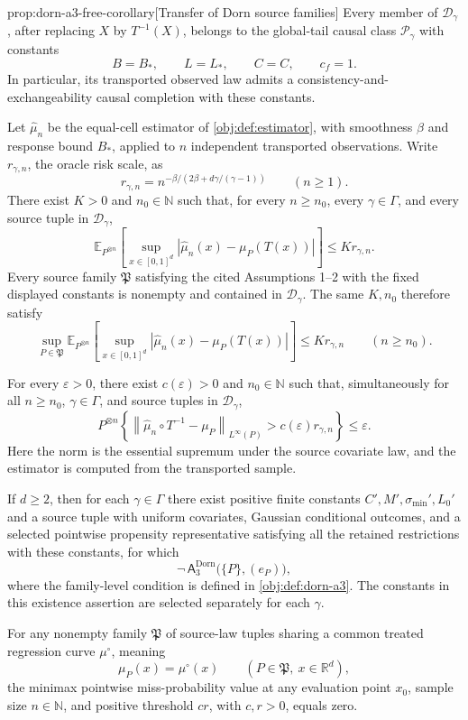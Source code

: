 \documentclass[11pt]{article}
\begin{document}
\begin{propositionv}{prop:dorn-a3-free-corollary}[Transfer of Dorn source families]
Every member of \(\mathcal D_\gamma\), after replacing \(X\) by \(T^{-1}(X)\), belongs to the global-tail causal class \(\mathcal P_\gamma\) with constants
\[
B=B_*,
\qquad L=L_*,
\qquad C=C,
\qquad c_f=1.
\]
In particular, its transported observed law admits a consistency-and-exchangeability causal completion with these constants.

Let \(\widehat\mu_n\) be the equal-cell estimator of \cref{obj:def:estimator}, with smoothness \(\beta\) and response bound \(B_*\), applied to \(n\) independent transported observations. Write \(r_{\gamma,n}\), the oracle risk scale, as
\[
r_{\gamma,n}=n^{-\beta/(2\beta+d\gamma/(\gamma-1))}
\qquad(n\ge1).
\]
There exist \(K>0\) and \(n_0\in\mathbb N\) such that, for every \(n\ge n_0\), every \(\gamma\in\Gamma\), and every source tuple in \(\mathcal D_\gamma\),
\[
\mathbb E_{P^{\otimes n}}
\left[
\sup_{x\in[0,1]^d}
\left|\widehat\mu_n(x)-\mu_P(T(x))\right|
\right]
\le K r_{\gamma,n}.
\]
Every source family \(\mathfrak P\) satisfying the cited Assumptions 1--2 with the fixed displayed constants is nonempty and contained in \(\mathcal D_\gamma\). The same \(K,n_0\) therefore satisfy
\[
\sup_{P\in\mathfrak P}
\mathbb E_{P^{\otimes n}}
\left[
\sup_{x\in[0,1]^d}
\left|\widehat\mu_n(x)-\mu_P(T(x))\right|
\right]
\le K r_{\gamma,n}
\qquad(n\ge n_0).
\]

For every \(\varepsilon>0\), there exist \(c(\varepsilon)>0\) and \(n_0\in\mathbb N\) such that, simultaneously for all \(n\ge n_0\), \(\gamma\in\Gamma\), and source tuples in \(\mathcal D_\gamma\),
\[
P^{\otimes n}\!\left\{
\left\|\widehat\mu_n\circ T^{-1}-\mu_P\right\|_{L^\infty(P)}
>c(\varepsilon)r_{\gamma,n}
\right\}\le\varepsilon.
\]
Here the norm is the essential supremum under the source covariate law, and the estimator is computed from the transported sample.

If \(d\ge2\), then for each \(\gamma\in\Gamma\) there exist positive finite constants \(C',M',\sigma_{\min}',L_0'\) and a source tuple with uniform covariates, Gaussian conditional outcomes, and a selected pointwise propensity representative satisfying all the retained restrictions with these constants, for which
\[
\neg\,
\mathsf A_{3}^{\mathrm{Dorn}}
\bigl(\{P\},(e_P)\bigr),
\]
where the family-level condition is defined in \cref{obj:def:dorn-a3}. The constants in this existence assertion are selected separately for each \(\gamma\).

For any nonempty family \(\mathfrak P\) of source-law tuples sharing a common treated regression curve \(\mu^\circ\), meaning
\[
\mu_P(x)=\mu^\circ(x)
\qquad(P\in\mathfrak P,\ x\in\mathbb R^d),
\]
the minimax pointwise miss-probability value at any evaluation point \(x_0\), sample size \(n\in\mathbb N\), and positive threshold \(cr\), with \(c,r>0\), equals zero.


\end{propositionv}
\end{document}

